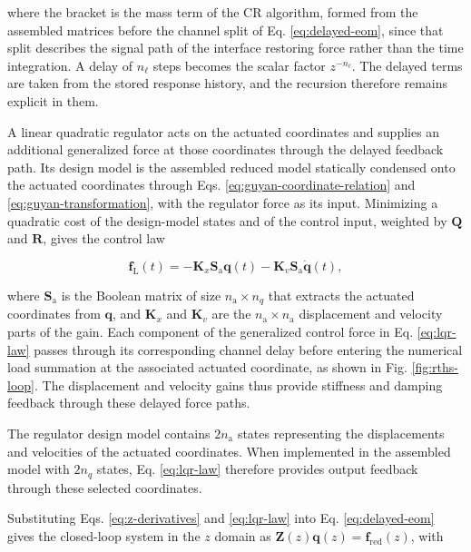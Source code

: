 \documentclass[a4paper,fleqn,review,12pt]{cas-sc}
\begin{document}
\noindent where the bracket is the mass term of the CR algorithm, formed from the assembled matrices before the channel split of Eq. \eqref{eq:delayed-eom}, since that split describes the signal path of the interface restoring force rather than the time integration. A delay of \(n_{\ell}\) steps becomes the scalar factor \(z^{-n_{\ell}}\). The delayed terms are taken from the stored response history, and the recursion therefore remains explicit in them.

A linear quadratic regulator acts on the actuated coordinates and supplies an additional generalized force at those coordinates through the delayed feedback path. Its design model is the assembled reduced model statically condensed onto the actuated coordinates through Eqs. \eqref{eq:guyan-coordinate-relation} and \eqref{eq:guyan-transformation}, with the regulator force as its input. Minimizing a quadratic cost of the design-model states and of the control input, weighted by \(\mathbf{Q}\) and \(\mathbf{R}\), gives the control law

\vspace{-3.5em}
\begin{equation}
	\bm{f}_{\mathrm{L}}(t)=
	-\mathbf{K}_{x}\mathbf{S}_{\mathrm{a}}\bm{q}(t)
	-\mathbf{K}_{v}\mathbf{S}_{\mathrm{a}}\dot{\bm{q}}(t),
	\label{eq:lqr-law}
\end{equation}
\vspace{-3.5em}

\noindent where \(\mathbf{S}_{\mathrm{a}}\) is the Boolean matrix of size \(n_{\mathrm{a}}\times n_{q}\) that extracts the actuated coordinates from \(\bm{q}\), and \(\mathbf{K}_{x}\) and \(\mathbf{K}_{v}\) are the \(n_{\mathrm{a}}\times n_{\mathrm{a}}\) displacement and velocity parts of the gain.
Each component of the generalized control force in Eq. \eqref{eq:lqr-law} passes through its corresponding channel delay before entering the numerical load summation at the associated actuated coordinate, as shown in Fig. \ref{fig:rths-loop}. The displacement and velocity gains thus provide stiffness and damping feedback through these delayed force paths.

The regulator design model contains \(2n_{\mathrm{a}}\) states representing the displacements and velocities of the actuated coordinates. When implemented in the assembled model with \(2n_q\) states, Eq. \eqref{eq:lqr-law} therefore provides output feedback through these selected coordinates.

Substituting Eqs. \eqref{eq:z-derivatives} and \eqref{eq:lqr-law} into Eq. \eqref{eq:delayed-eom} gives the closed-loop system in the \(z\) domain as \(\mathbf{Z}(z)\bm{q}(z)=\bm{f}_{\mathrm{red}}(z)\), with
\end{document}
